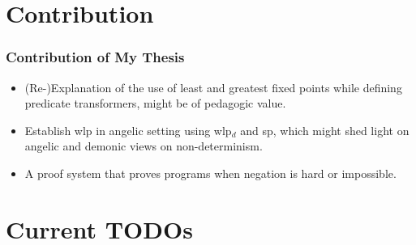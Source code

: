 \documentclass[aspectratio=169]{beamer}
\begin{document}
\section{Contribution }

\begin{frame}[fragile]
	\frametitle{Contribution of My Thesis}
	\begin{itemize}
	    \item (Re-)Explanation of the use of least and greatest fixed points while defining predicate transformers, might be of pedagogic value. 
	    \item Establish wlp in angelic setting using wlp$_d$ and sp, which might shed light on angelic and demonic views on non-determinism. 
	    \item A proof system that proves programs when negation is hard or impossible. 
	\end{itemize}
\end{frame}

\section{Current TODOs }
\end{document}
